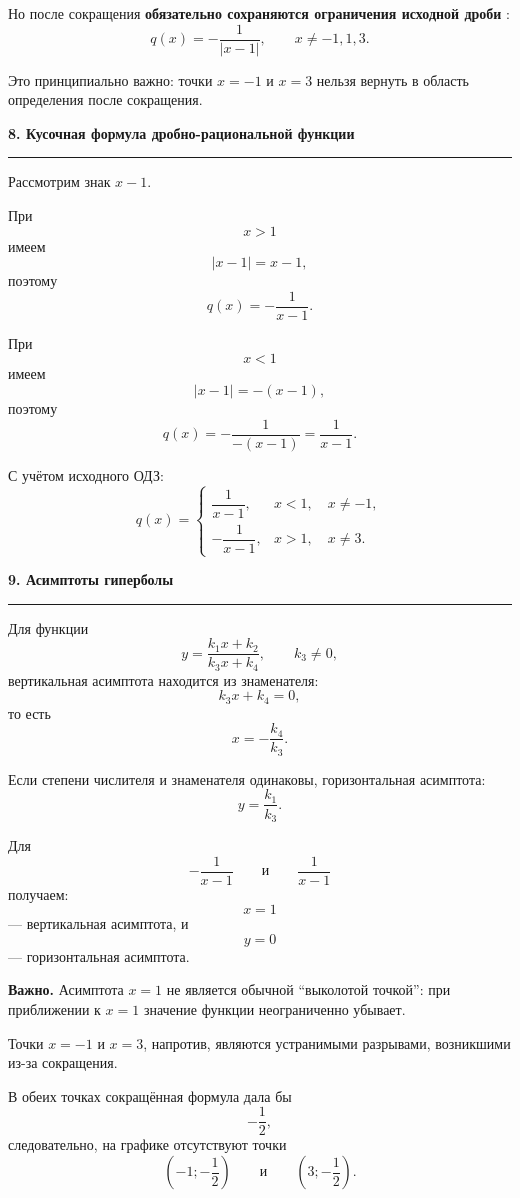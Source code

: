 \documentclass[a4paper,12pt]{article}
\newcommand{\lessonsection}[1]{%
    \vspace{0.6em}
    {\Large\bfseries\color{darkaccent}#1}\par
    \vspace{0.15em}
    {\color{softgray}\rule{\linewidth}{0.8pt}}
    \vspace{0.3em}
}
\newcommand{\important}[1]{%
    {\color{darkaccent}\bfseries #1}%
}
\begin{document}
Но после сокращения \important{обязательно сохраняются ограничения исходной дроби}:
\[
\boxed{
q(x)=-\frac1{|x-1|},
\qquad
x\ne-1,1,3.}
\]

Это принципиально важно:
точки \(x=-1\) и \(x=3\) нельзя вернуть в область определения после
сокращения.


\lessonsection{8. Кусочная формула дробно-рациональной функции}

Рассмотрим знак \(x-1\).

При
\[
x>1
\]
имеем
\[
|x-1|=x-1,
\]
поэтому
\[
q(x)=-\frac1{x-1}.
\]

При
\[
x<1
\]
имеем
\[
|x-1|=-(x-1),
\]
поэтому
\[
q(x)
=
-\frac1{-(x-1)}
=
\frac1{x-1}.
\]

С учётом исходного ОДЗ:
\[
\boxed{
q(x)=
\begin{cases}
\dfrac1{x-1},
&
x<1,\quad x\ne-1,
\\[3mm]
-\dfrac1{x-1},
&
x>1,\quad x\ne3.
\end{cases}}
\]


\lessonsection{9. Асимптоты гиперболы}

Для функции
\[
y=\frac{k_1x+k_2}{k_3x+k_4},
\qquad k_3\ne0,
\]
вертикальная асимптота находится из знаменателя:
\[
k_3x+k_4=0,
\]
то есть
\[
\boxed{x=-\frac{k_4}{k_3}}.
\]

Если степени числителя и знаменателя одинаковы, горизонтальная асимптота:
\[
\boxed{y=\frac{k_1}{k_3}}.
\]

Для
\[
-\frac1{x-1}
\qquad\text{и}\qquad
\frac1{x-1}
\]
получаем:
\[
\boxed{x=1}
\]
--- вертикальная асимптота,
и
\[
\boxed{y=0}
\]
--- горизонтальная асимптота.

\textbf{Важно.}
Асимптота \(x=1\) не является обычной ``выколотой точкой'':
при приближении к \(x=1\) значение функции неограниченно убывает.

Точки \(x=-1\) и \(x=3\), напротив, являются устранимыми разрывами,
возникшими из-за сокращения.

В обеих точках сокращённая формула дала бы
\[
-\frac12,
\]
следовательно, на графике отсутствуют точки
\[
\boxed{\left(-1;-\frac12\right)}
\qquad\text{и}\qquad
\boxed{\left(3;-\frac12\right)}.
\]
\end{document}
